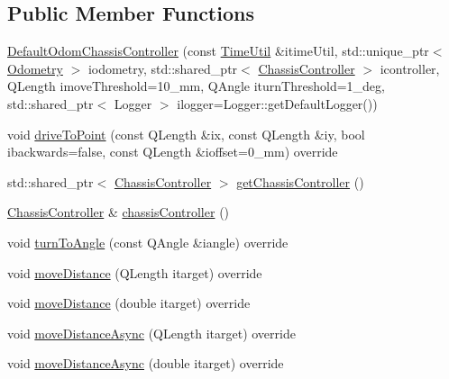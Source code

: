 \subsection*{Public Member Functions}
\begin{DoxyCompactItemize}
\item 
\mbox{\hyperlink{classokapi_1_1DefaultOdomChassisController_a5fe023ef9ccab0532fd29d237bc91677}{Default\+Odom\+Chassis\+Controller}} (const \mbox{\hyperlink{classokapi_1_1TimeUtil}{Time\+Util}} \&itime\+Util, std\+::unique\+\_\+ptr$<$ \mbox{\hyperlink{classokapi_1_1Odometry}{Odometry}} $>$ iodometry, std\+::shared\+\_\+ptr$<$ \mbox{\hyperlink{classokapi_1_1ChassisController}{Chassis\+Controller}} $>$ icontroller, Q\+Length imove\+Threshold=10\+\_\+mm, Q\+Angle iturn\+Threshold=1\+\_\+deg, std\+::shared\+\_\+ptr$<$ Logger $>$ ilogger=\+Logger\+::get\+Default\+Logger())
\item 
void \mbox{\hyperlink{classokapi_1_1DefaultOdomChassisController_a31474749c8a6c0dca45a4c02418fadab}{drive\+To\+Point}} (const Q\+Length \&ix, const Q\+Length \&iy, bool ibackwards=false, const Q\+Length \&ioffset=0\+\_\+mm) override
\item 
std\+::shared\+\_\+ptr$<$ \mbox{\hyperlink{classokapi_1_1ChassisController}{Chassis\+Controller}} $>$ \mbox{\hyperlink{classokapi_1_1DefaultOdomChassisController_a2b5fc33c7fbe8d6fd49f4fd46fb84a2d}{get\+Chassis\+Controller}} ()
\item 
\mbox{\hyperlink{classokapi_1_1ChassisController}{Chassis\+Controller}} \& \mbox{\hyperlink{classokapi_1_1DefaultOdomChassisController_add1bed5d02d3da37306ef0016b7ad8a2}{chassis\+Controller}} ()
\item 
void \mbox{\hyperlink{classokapi_1_1DefaultOdomChassisController_aaf6e4d74384b87510d35b639e45f9dc2}{turn\+To\+Angle}} (const Q\+Angle \&iangle) override
\item 
void \mbox{\hyperlink{classokapi_1_1DefaultOdomChassisController_a3143bc60f72ab8ff8f63aad9a810a1c6}{move\+Distance}} (Q\+Length itarget) override
\item 
void \mbox{\hyperlink{classokapi_1_1DefaultOdomChassisController_a42abd53b9a0b96b722186ada8eb13d98}{move\+Distance}} (double itarget) override
\item 
void \mbox{\hyperlink{classokapi_1_1DefaultOdomChassisController_a61ca0d303fcbfd08932157af9adbbb12}{move\+Distance\+Async}} (Q\+Length itarget) override
\item 
void \mbox{\hyperlink{classokapi_1_1DefaultOdomChassisController_ab1abaec33ecce2515895d3a8af363c8c}{move\+Distance\+Async}} (double itarget) override

\end{DoxyCompactItemize}
